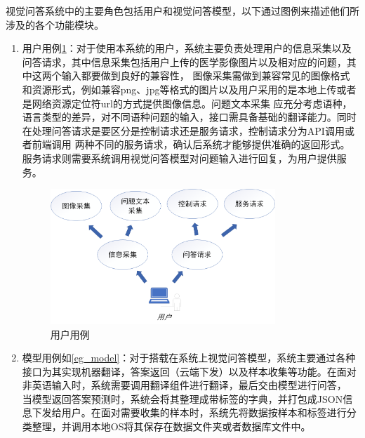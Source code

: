 视觉问答系统中的主要角色包括用户和视觉问答模型，以下通过图例来描述他们所涉及的各个功能模块。
\begin{enumerate}[topsep = 0 pt, itemsep= 0 pt, parsep=0pt, partopsep=0pt, leftmargin=44pt, itemindent=0pt, labelsep=6pt, label=(\arabic*)]
    \item 用户用例\ref{eg_user}：对于使用本系统的用户，系统主要负责处理用户的信息采集以及问答请求，其中信息采集包括用户上传的医学影像图片以及相对应的问题，其中这两个输入都要做到良好的兼容性，
    图像采集需做到兼容常见的图像格式和资源形式，例如兼容png、jpg等格式的图片以及用户采用的是本地上传或者是网络资源定位符url的方式提供图像信息。问题文本采集
	应充分考虑语种，语言类型的差异，对不同语种问题的输入，接口需具备基础的翻译能力。同时在处理问答请求是要区分是控制请求还是服务请求，控制请求分为API调用或者前端调用
	两种不同的服务请求，确认后系统才能够提供准确的返回形式。服务请求则需要系统调用视觉问答模型对问题输入进行回复，为用户提供服务。
    \begin{figure}[htbp]
        \centering	
        \includegraphics[width=0.8\textwidth]{Fig/myfig/chapter5/eg_user.png}  %
        \caption{\label{eg_user}用户用例} 
    \end{figure}
    \item 模型用例如\ref{eg_model}：对于搭载在系统上视觉问答模型，系统主要通过各种接口为其实现机器翻译，答案返回（云端下发）以及样本收集等功能。在面对非英语输入时，系统需要调用翻译组件进行翻译，最后交由模型进行问答，
    当模型返回答案预测时，系统会将其整理成带标签的字典，并打包成JSON信息下发给用户。在面对需要收集的样本时，系统先将数据按样本和标签进行分类整理，并调用本地OS将其保存在数据文件夹或者数据库文件中。
    \begin{figure}[htbp]
        \centering	

\end{figure}
\end{enumerate}
